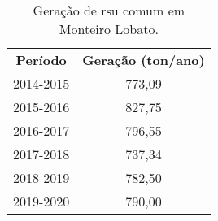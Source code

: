 \begin{table}[htbp]
  \centering
  \caption{Geração de \gls{rsu} comum em Monteiro Lobato.}
    \begin{tabular}{cc}
	\rowcolor[rgb]{ .969,  .588,  .275} \textcolor[rgb]{ 1,  1,  1}{\textbf{Período}} & \multicolumn{1}{p{11.955em}}{\textcolor[rgb]{ 1,  1,  1}{\textbf{Geração (ton/ano)}}} \\
	\rowcolor[rgb]{ .992,  .914,  .851} 2014-2015 & 773,09 \\
	\rowcolor[rgb]{ .984,  .831,  .706} 2015-2016 & 827,75 \\
	\rowcolor[rgb]{ .992,  .914,  .851} 2016-2017 & 796,55 \\
	\rowcolor[rgb]{ .984,  .831,  .706} 2017-2018 & 737,34 \\
	\rowcolor[rgb]{ .992,  .914,  .851} 2018-2019 & 782,50 \\
	\rowcolor[rgb]{ .984,  .831,  .706} 2019-2020 & 790,00 \\
\end{tabular}%
  \label{tab:geracao}%
\end{table}%